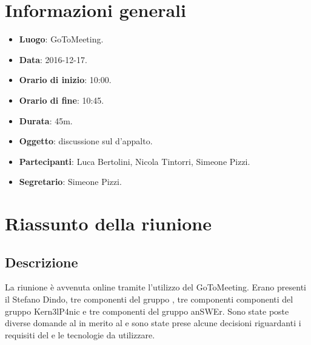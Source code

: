 \documentclass[a4paper,titlepage]{article}
\begin{document}
\maketitle
\begin{diario}
\end{diario}
\newpage
\tableofcontents

\newpage
\section{Informazioni generali}
\label{sec:Informazioni}

\begin{itemize}
  \item \textbf{Luogo}: GoToMeeting.
  \item \textbf{Data}: 2016-12-17.
  \item \textbf{Orario di inizio}: 10:00.
  \item \textbf{Orario di fine}: 10:45.
  \item \textbf{Durata}: 45m.
  \item \textbf{Oggetto}: discussione sul  d'appalto.
  \item \textbf{Partecipanti}: Luca Bertolini, Nicola Tintorri, Simeone Pizzi.
  \item \textbf{Segretario}: Simeone Pizzi.

\end{itemize}
\section{Riassunto della riunione}
\label{sec:RiassuntoRiunione}
 \subsection{Descrizione}
La riunione è avvenuta online tramite l'utilizzo del  GoToMeeting. Erano presenti il  Stefano Dindo, tre componenti del gruppo \GRUPPO{}, tre componenti componenti del gruppo Kern3lP4nic e tre componenti del gruppo anSWEr. Sono state poste diverse domande al  in merito al   \quotes{\CAPITOLATO} e sono state prese alcune decisioni riguardanti i requisiti del  e le tecnologie da utilizzare.
\end{document}
